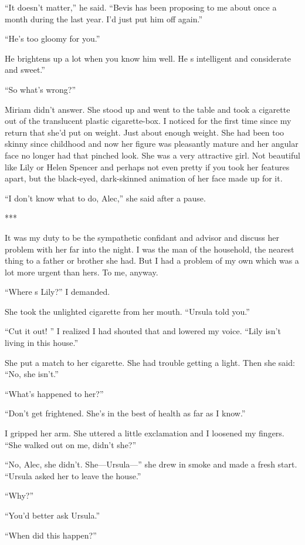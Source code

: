 \documentclass{novel}
\begin{document}
{“It doesn’t matter,” he said. “Bevis has been proposing to me about once a month during the last year. I’d just put him off again.”

“He’s too gloomy for you.”

He brightens up a lot when you know him well. He s intelligent and considerate and sweet.”

“So what’s wrong?”

Miriam didn’t answer. She stood up and went to the table and took a cigarette out of the translucent plastic cigarette-box. I noticed for the first time since my return that she’d put on weight. Just about enough weight. She had been too skinny since childhood and now her figure was pleasantly mature and her angular face no longer had that pinched look. She was a very attractive girl. Not beautiful like Lily or Helen Spencer and perhaps not even pretty if you took her features apart, but the black-eyed, dark-skinned animation of her face made up for it.

“I don’t know what to do, Alec,” she said after a pause.

***

It was my duty to be the sympathetic confidant and advisor and discuss her problem with her far into the night. I was the man of the household, the nearest thing to a father or brother she had. But I had a problem of my own which was a lot more urgent than hers. To me, anyway.

“Where s Lily?” I demanded.

She took the unlighted cigarette from her mouth. “Ursula told you.”

“Cut it out! ” I realized I had shouted that and lowered my voice. “Lily isn’t living in this house.”

She put a match to her cigarette. She had trouble getting a light. Then she said: “No, she isn’t.”

“What’s happened to her?”

“Don’t get frightened. She’s in the best of health as far as I know.”

I gripped her arm. She uttered a little exclamation and I loosened my fingers. “She walked out on me, didn’t she?”

“No, Alec, she didn’t. She—Ursula—” she drew in smoke and made a fresh start. “Ursula asked her to leave the house.”

“Why?”

“You’d better ask Ursula.”

“When did this happen?”

}
\end{document}
